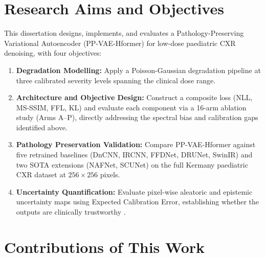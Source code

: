 \documentclass[12pt, a4paper, twoside, openright]{book}
\begin{document}
\section{Research Aims and Objectives}
\label{sec:intro:aims}

This dissertation designs, implements, and evaluates a Pathology-Preserving Variational Autoencoder (PP-VAE-Hformer) for low-dose paediatric CXR denoising, with four objectives:

\begin{enumerate}
  \item \textbf{Degradation Modelling:} Apply a Poisson-Gaussian degradation pipeline \cite{foi_practical_2008} at three calibrated severity levels spanning the clinical dose range.

  \item \textbf{Architecture and Objective Design:} Construct a composite loss (NLL, MS-SSIM, FFL, KL) and evaluate each component via a 16-arm ablation study (Arms A--P), directly addressing the spectral bias \cite{rahaman_spectral_2019} and calibration gaps identified above.

  \item \textbf{Pathology Preservation Validation:} Compare PP-VAE-Hformer against five retrained baselines (DnCNN, IRCNN, FFDNet, DRUNet, SwinIR) and two SOTA extensions (NAFNet, SCUNet) on the full Kermany paediatric CXR dataset \cite{kermany_identifying_2018} at $256\times256$ pixels.

  \item \textbf{Uncertainty Quantification:} Evaluate pixel-wise aleatoric and epistemic uncertainty maps using Expected Calibration Error, establishing whether the outputs are clinically trustworthy \cite{kendall_what_2017}.
\end{enumerate}

\section{Contributions of This Work}
\label{sec:intro:contributions}
\end{document}
